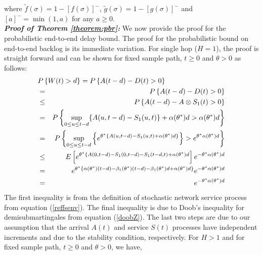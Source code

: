 \documentclass[letterpaper]{IEEEtran}
\begin{document}
where $\tilde{f}(\sigma) =  1 - \left[f(\sigma) \right]^- $, $\tilde{g}(\sigma) = 1 - \left[g(\sigma)\right]^-$ and $[a]^- = \min(1,a)$ for any $a \ge 0$.\\
\textbf{\textit{Proof of Theorem \ref{theorem:pbr}:}} We now provide the proof for the probabilistic end-to-end delay bound. The proof for the probabilistic bound on end-to-end backlog is its immediate variation. For single hop ($H=1$), the proof is straight forward and can be shown for fixed sample path, $t \ge 0$ and $\theta > 0$ as follows:
\small
\begin{eqnarray}
\lefteqn{P\left\{ W(t) > d \right\} = P\left\{ A(t-d) - D(t) > 0 \right\}}  \nonumber\\
&=& P\left\{ A(t-d) - D(t) > 0 \right\} \nonumber\\
&\le& P\left\{ A(t-d) - A \otimes S_1(t)  > 0  \right\} \nonumber\\
&=& P\left\{\sup_{0 \le u \le t-d}\{A(u,t-d) - S_1(u,t)\} + \alpha(\theta^*)d > \alpha(\theta^*)d \right\} \nonumber\\ 
&=&P\left\{\sup_{0 \le u \le t-d}\left\{e^{\theta^*\{A(u,t-d) - S_1(u,t) + \alpha(\theta^*)d \}} \right\} > e^{\theta^*\alpha(\theta^*)d} \right\} \nonumber\\
&\le&E\left[ e^{\theta^*\{A(0,t-d) - S_1(0,t-d) - S_1(t-d,t) + \alpha(\theta^*)d} \right] e^{-\theta^*\alpha(\theta^*)d}\nonumber\\
&=&e^{\theta^* \{ \alpha(\theta^*)(t-d) - \beta_1(\theta^*)(t-d) - \beta_1(\theta^*)d + \alpha(\theta^*)d\}}e^{-\theta^* \alpha(\theta^*)d}\nonumber\\
&=&e^{-\theta^* \alpha(\theta^*)d} \label{s1d}
\end{eqnarray}
\normalsize
The first inequality is from the definition of stochastic network service process from equation (\ref{reffsenv}). The final inequality is due to Doob's inequality for demisubmartingales from equation (\ref{doobZ}). The last two steps are due to our assumption that the arrival $A(t)$ and service $S(t)$  processes have independent increments and due to the stability condition, respectively. For $H>1$ and for fixed sample path, $t \ge 0$ and $\theta > 0$, we have,
\small
\end{document}
